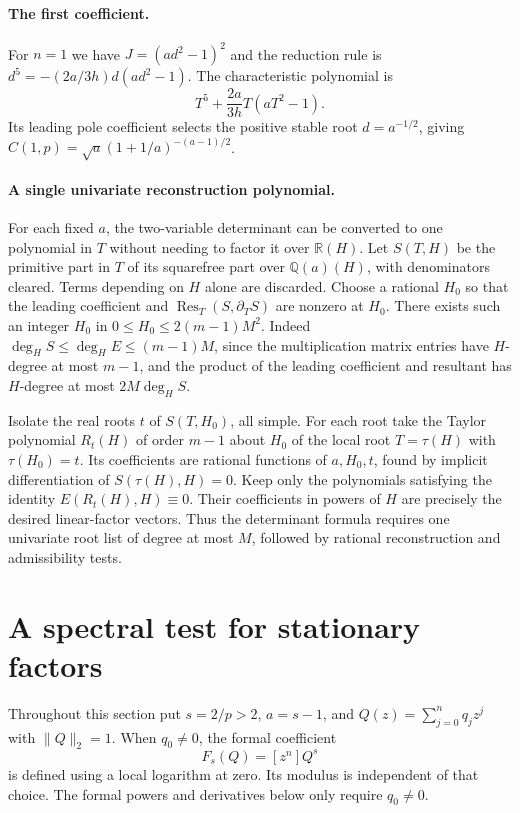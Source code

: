 \documentclass[11pt]{article}
\begin{document}
\paragraph{The first coefficient.}
For \(n=1\) we have \(J=(ad^2-1)^2\) and the reduction rule is
\(d^5=-(2a/3h)d(ad^2-1)\).
The characteristic polynomial is
\[
 T^5+\frac{2a}{3h}T(aT^2-1).
\]
Its leading pole coefficient selects the positive stable root
\(d=a^{-1/2}\), giving
\(C(1,p)=\sqrt a(1+1/a)^{-(a-1)/2}\).

\paragraph{A single univariate reconstruction polynomial.}
For each fixed \(a\), the two-variable determinant can be converted
to one polynomial in \(T\) without needing to factor it over
\(\mathbb R(H)\). Let \(S(T,H)\) be the primitive part in \(T\) of
its squarefree part over \(\mathbb Q(a)(H)\), with denominators
cleared. Terms depending on \(H\) alone are discarded. Choose a
rational \(H_0\) so that the leading coefficient and
\(\operatorname{Res}_T(S,\partial_T S)\) are nonzero at \(H_0\).
There exists such an integer \(H_0\) in
\(0\leq H_0\leq 2(m-1)M^2\). Indeed
\(\deg_H S\leq\deg_H E\leq (m-1)M\), since the multiplication
matrix entries have \(H\)-degree at most \(m-1\), and the product
of the leading coefficient and resultant has \(H\)-degree at
most \(2M\deg_H S\).

Isolate the real roots \(t\) of \(S(T,H_0)\), all simple. For each
root take the Taylor polynomial \(R_t(H)\) of order \(m-1\)
about \(H_0\) of the local root \(T=\tau(H)\) with \(\tau(H_0)=t\).
Its coefficients are rational functions of \(a,H_0,t\), found
by implicit differentiation of \(S(\tau(H),H)=0\). Keep only the
polynomials satisfying the identity \(E(R_t(H),H)\equiv0\).
Their coefficients in powers of \(H\) are precisely the desired
linear-factor vectors. Thus the determinant formula requires
one univariate root list of degree at most \(M\), followed
by rational reconstruction and admissibility tests.

\section{A spectral test for stationary factors}

Throughout this section put \(s=2/p>2\), \(a=s-1\), and
\(Q(z)=\sum_{j=0}^n q_jz^j\) with \(\|Q\|_2=1\).
When \(q_0\ne0\), the formal coefficient
\[
 F_s(Q)=[z^n]Q^s
\]
is defined using a local logarithm at zero. Its modulus is
independent of that choice. The formal powers and derivatives
below only require \(q_0\ne0\).
\end{document}
